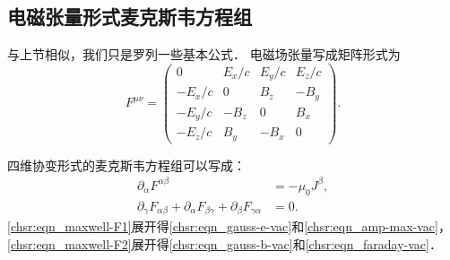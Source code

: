 \subsection{电磁张量形式麦克斯韦方程组}
与上节相似，我们只是罗列一些基本公式．
电磁场张量写成矩阵形式为
\begin{equation}
    F^{\mu\nu} = \begin{pmatrix}
        0 & E_x/c & E_y/c & E_z/c \\
        -E_x/c & 0 & B_z & -B_y \\
        -E_y/c & -B_z & 0 & B_x \\
        -E_z/c & B_y & -B_x & 0
    \end{pmatrix}.
\end{equation}


四维协变形式的麦克斯韦方程组可以写成：
\begin{subequations}\label{chsr:eqn_maxwell-F}
    \begin{align}
        \partial_{\alpha} F^{\alpha\beta} &= -\mu_0 J^{\beta} ,   \label{chsr:eqn_maxwell-F1} \\
        \partial_\gamma F_{ \alpha \beta } + \partial_\alpha F_{ \beta \gamma }
        + \partial_\beta F_{ \gamma \alpha } &= 0. \label{chsr:eqn_maxwell-F2}
    \end{align}
\end{subequations}
\eqref{chsr:eqn_maxwell-F1}展开得\eqref{chsr:eqn_gauss-e-vac}和\eqref{chsr:eqn_amp-max-vac}，
\eqref{chsr:eqn_maxwell-F2}展开得\eqref{chsr:eqn_gauss-b-vac}和\eqref{chsr:eqn_faraday-vac}．


